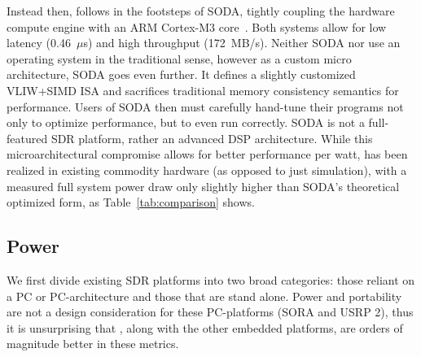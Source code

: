 \begin{comment}
Ettus's USRP platform also relies on a controlling PC, however it trades
throughput for flexibility. The USRP is a run-time peripheral, utilizing
either USB (480~Mbits/s) or Ethernet (1~Gb/s) as a interconnect. The effective
rate, however, is limited by hardware components to 50~MHz receiving and 25~MHz
transmitting).  Nychis further shows in~\cite{cmu-mac-sdr} that the
variable latency of the USB and Ethernet interfaces further reduce the
effective throughput when reliable latency is required - a key component in
the development of low-power protocols. Ettus's embedded E100 platform suffers
from the same limitations, running a full Linux instance on the embedded
Gumstix platform to interface with the software radio over the same
channels~\cite{ettus}. %
\end{comment}
%
Instead then, \sdr follows in the footsteps of SODA, tightly coupling
the hardware compute engine with an ARM Cortex-M3 core~\cite{soda}. Both systems
allow for low latency (0.46~$\mu$s) and high throughput
(172~MB/s). 
Neither SODA nor \sdr use an operating system in the traditional
sense, however as a custom micro architecture, SODA goes even
further. It defines a slightly customized VLIW+SIMD ISA and sacrifices
traditional memory consistency semantics for performance. Users of
SODA then must carefully hand-tune their programs not only to optimize
performance, but to even run correctly. SODA is not a full-featured
SDR platform, rather an advanced DSP architecture. While this
microarchitectural compromise allows for better performance per watt,
\sdr has been realized in existing commodity hardware (as opposed to
just simulation), with a measured full system power draw only slightly
higher than SODA's theoretical optimized form, as
Table~\ref{tab:comparison} shows.

\subsection{Power}
\label{sec:related-power}
We first divide existing
SDR platforms into two broad categories: those reliant on a PC or
PC-architecture and those that are stand alone. Power and portability
are not a design consideration for these PC-platforms (SORA and USRP
2), thus it is unsurprising that \sdr, along with the other embedded
platforms, are orders of magnitude better in these metrics.

